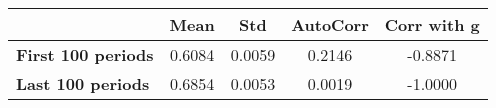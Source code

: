 \begin{tiny}\begin{tabular}{|l|c|c|c|c|}
\hline
&\textbf{Mean}&\textbf{Std}&\textbf{AutoCorr}&\textbf{Corr with g}\\\hline
\textbf{First 100 periods}&0.6084&0.0059&0.2146&-0.8871\\\hline
\textbf{Last 100 periods}&0.6854&0.0053&0.0019&-1.0000\\\hline
\end{tabular}
\end{tiny}